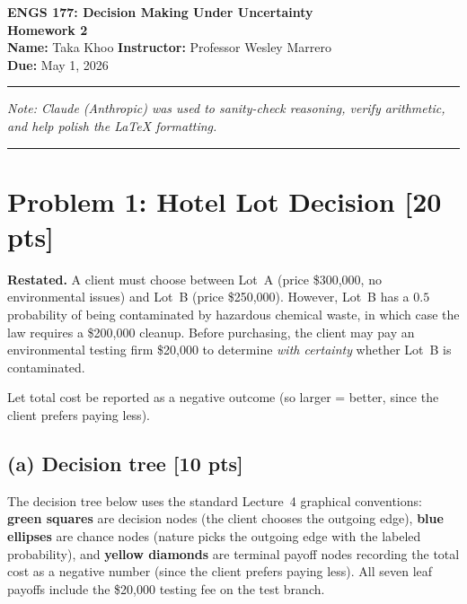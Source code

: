 \documentclass[12pt]{article}
\begin{document}
\begin{center}
  {\LARGE \textbf{ENGS 177: Decision Making Under Uncertainty}}\\[0.35em]
  {\Large \textbf{Homework 2}}\\[0.25em]
  \textbf{Name:} Taka Khoo \quad\textbullet\quad \textbf{Instructor:} Professor Wesley Marrero\\[0.25em]
  \textbf{Due:} May 1, 2026
\end{center}
\hrule
\vspace{0.25em}

\footnotesize\textit{Note: Claude (Anthropic) was used to sanity-check reasoning, verify arithmetic, and help polish the \LaTeX{} formatting.}
\normalsize
\vspace{0.5em}
\hrule

\section*{Problem 1: Hotel Lot Decision \hfill [20 pts]}

\textbf{Restated.} A client must choose between Lot~A (price \$300{,}000, no environmental issues) and Lot~B (price \$250{,}000). However, Lot~B has a $0.5$ probability of being contaminated by hazardous chemical waste, in which case the law requires a \$200{,}000 cleanup. Before purchasing, the client may pay an environmental testing firm \$20{,}000 to determine \emph{with certainty} whether Lot~B is contaminated.

Let total cost be reported as a negative outcome (so larger = better, since the client prefers paying less).

\subsection*{(a) Decision tree \hfill [10 pts]}

The decision tree below uses the standard Lecture~4 graphical conventions: \textbf{green squares} are decision nodes (the client chooses the outgoing edge), \textbf{blue ellipses} are chance nodes (nature picks the outgoing edge with the labeled probability), and \textbf{yellow diamonds} are terminal payoff nodes recording the total cost as a negative number (since the client prefers paying less). All seven leaf payoffs include the \$20{,}000 testing fee on the test branch.
\end{document}
